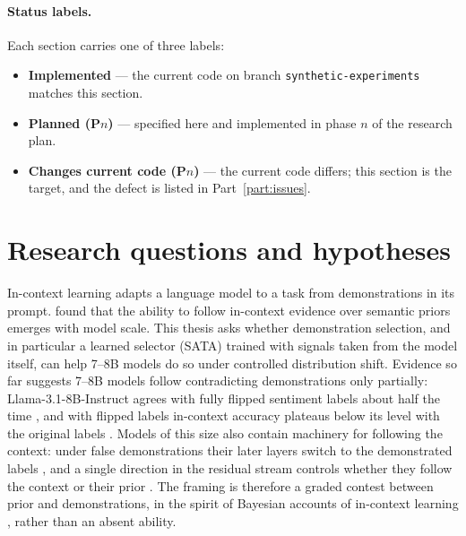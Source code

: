 \documentclass[11pt,a4paper]{article}
\newcommand{\1}{\mathbf{1}}
\theoremstyle{plain}
\theoremstyle{definition}
\theoremstyle{remark}
\newcommand{\status}[1]{\par\noindent\hfill\fcolorbox{black!35}{black!4}{\scriptsize\sffamily Status: #1}\par\medskip}
\begin{document}
\paragraph{Status labels.}
Each section carries one of three labels:
\begin{itemize}[nosep]
  \item \textbf{Implemented} --- the current code on branch
        \texttt{synthetic-experiments} matches this section.
  \item \textbf{Planned (P$n$)} --- specified here and implemented in phase
        $n$ of the research plan.
  \item \textbf{Changes current code (P$n$)} --- the current code differs;
        this section is the target, and the defect is listed in
        Part~\ref{part:issues}.
\end{itemize}

\section{Research questions and hypotheses}
\label{sec:rqs}
\status{Planned (P4--P6)}

In-context learning \citep{brown2020language,dong2024survey} adapts a
language model to a task from demonstrations in its prompt.
\citet{wei2023larger} found that the ability to follow in-context evidence
over semantic priors emerges with model scale. This thesis asks whether
demonstration selection, and in particular a learned selector (SATA) trained
with signals taken from the model itself, can help 7--8B models do so under
controlled distribution shift. Evidence so far suggests 7--8B models follow
contradicting demonstrations only partially: Llama-3.1-8B-Instruct agrees
with fully flipped sentiment labels about half the time
\citep{krishnakumar2025semantic}, and with flipped labels in-context
accuracy plateaus below its level with the original labels
\citep{kossen2024incontext}. Models of this size also contain machinery for
following the context: under false demonstrations their later layers switch
to the demonstrated labels \citep{halawi2024overthinking}, and a single
direction in the residual stream controls whether they follow the context
or their prior \citep{minder2025controllable}. The framing is therefore a
graded contest between prior and demonstrations, in the spirit of Bayesian
accounts of in-context learning \citep{xie2022explanation},
rather than an absent ability.
\end{document}
